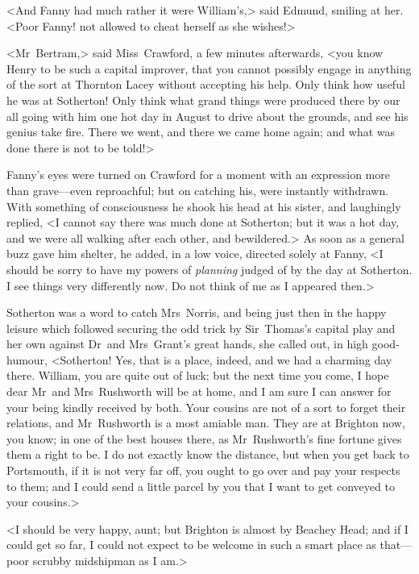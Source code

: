 <And Fanny had much rather it were William's,> said Edmund, smiling at her. <Poor Fanny! not allowed to cheat herself as she wishes!>

<Mr~Bertram,> said Miss~Crawford, a few minutes afterwards, <you know Henry to be such a capital improver, that you cannot possibly engage in anything of the sort at Thornton Lacey without accepting his help. Only think how useful he was at Sotherton! Only think what grand things were produced there by our all going with him one hot day in August to drive about the grounds, and see his genius take fire. There we went, and there we came home again; and what was done there is not to be told!>

Fanny's eyes were turned on Crawford for a moment with an expression more than grave—even reproachful; but on catching his, were instantly withdrawn. With something of consciousness he shook his head at his sister, and laughingly replied, <I cannot say there was much done at Sotherton; but it was a hot day, and we were all walking after each other, and bewildered.> As soon as a general buzz gave him shelter, he added, in a low voice, directed solely at Fanny, <I should be sorry to have my powers of \textit{planning}  judged of by the day at Sotherton. I see things very differently now. Do not think of me as I appeared then.>

Sotherton was a word to catch Mrs~Norris, and being just then in the happy leisure which followed securing the odd trick by Sir~Thomas's capital play and her own against Dr~and Mrs~Grant's great hands, she called out, in high good-humour, <Sotherton! Yes, that is a place, indeed, and we had a charming day there. William, you are quite out of luck; but the next time you come, I hope dear Mr~and Mrs~Rushworth will be at home, and I am sure I can answer for your being kindly received by both. Your cousins are not of a sort to forget their relations, and Mr~Rushworth is a most amiable man. They are at Brighton now, you know; in one of the best houses there, as Mr~Rushworth's fine fortune gives them a right to be. I do not exactly know the distance, but when you get back to Portsmouth, if it is not very far off, you ought to go over and pay your respects to them; and I could send a little parcel by you that I want to get conveyed to your cousins.>

<I should be very happy, aunt; but Brighton is almost by Beachey Head; and if I could get so far, I could not expect to be welcome in such a smart place as that—poor scrubby midshipman as I am.>

